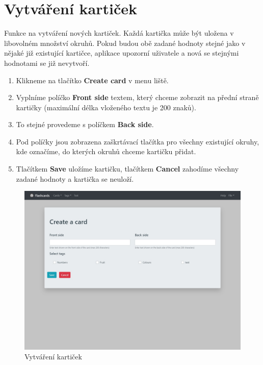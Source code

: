 \documentclass[11pt]{article}
\providecommand{\tightlist}{\setlength{\itemsep}{1pt}\setlength{\parskip}{1pt}}
\begin{document}
\hypertarget{vytvuxe1ux159enuxed-kartiux10dek}{%
\section{Vytváření kartiček}\label{vytvuxe1ux159enuxed-kartiux10dek}}

Funkce na vytváření nových kartiček. Každá kartička může být uložena v
libovolném množství okruhů. Pokud budou obě zadané hodnoty stejné jako v
nějaké již existující kartičce, aplikace upozorní uživatele a nová se
stejnými hodnotami se již nevytvoří.

\begin{enumerate}
\def\labelenumi{\arabic{enumi}.}
\tightlist
\item
  Klikneme na tlačítko \textbf{Create card} v menu liště.
\item
  Vyplníme políčko \textbf{Front side} textem, který chceme zobrazit na
  přední straně kartičky (maximální délka vloženého textu je 200 znaků).
\item
  To stejné provedeme s políčkem \textbf{Back side}.
\item
  Pod políčky jsou zobrazena zaškrtávací tlačítka pro všechny existující
  okruhy, kde označíme, do kterých okruhů chceme kartičku přidat.
\item
  Tlačítkem \textbf{Save} uložíme kartičku, tlačítkem \textbf{Cancel}
  zahodíme všechny zadané hodnoty a kartička se neuloží.
\end{enumerate}

\begin{figure}
\centering
\includegraphics{assets/create_card.jpg}
\caption{Vytváření kartiček}
\end{figure}
\end{document}
